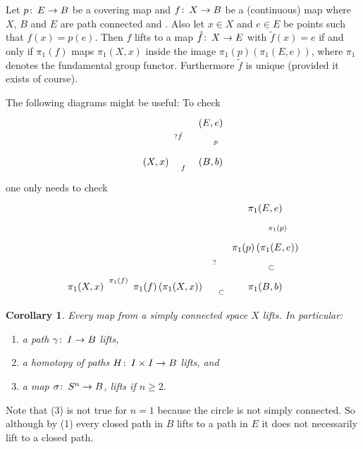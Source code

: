 \documentclass[12pt]{article}
\newtheorem{cor}[thm]{Corollary}
\theoremstyle{definition}
\theoremstyle{remark}
\numberwithin{equation}{subsection}
\newcommand{\Gg}{\gamma}
\newcommand{\Gs}{\sigma}
\def\co{\colon\thinspace}
\begin{document}
Let $p\co E\to B$ be a covering map and $f\co X\to B$ be a (continuous)
map where $X$,  $B$ and $E$ are path connected and .  
Also let $x\in X$  and $e\in E$ be points such that $f(x)=p(e)$.
 Then $f$ lifts to a map $\tilde f\co X\to E$ with $\tilde f(x)=e$ if and only if
$\pi_1(f)$ maps  $\pi_1(X,x)$ inside the image
$\pi_1(p)\left(\pi_1(E,e)\right)$, where $\pi_1$ denotes the fundamental
group functor. Furthermore $\tilde f$ is unique (provided it exists of course).

The following diagrams might be useful: To check
$$\xymatrix{
&{(E,e)}\ar[d]^{p}\\
{(X,x)}\ar[r]_{f}\ar@{-->}[ur]^{?\tilde f}&{(B,b)} }
$$
one only needs to check
$$\xymatrix{
&&{\pi_1(E,e)}\ar[d]^{\pi_1(p)}\\
&&{\pi_1(p)\left(\pi_1(E,e)\right)}\ar[d]^{\subset}\\
{\pi_1(X,x)}\ar[r]^-{\pi_1(f)}&{\pi_1(f)\left(\pi_1(X,x)\right)}\ar@{-->}[ur]^{?}\ar[r]_{\quad\subset}& {\pi_1(B,b)} }
$$

\begin{cor}
  Every map from a simply connected space $X$ lifts. In particular:
  \begin{enumerate}
  \item a path $\Gg\co I\to B$ lifts, 
  \item a homotopy of paths $H\co I\times I\to B$ lifts, and
  \item a map $\Gs\co S^n\to B$, lifts if $n\geq 2$. 
  \end{enumerate}
\end{cor}

Note that (3) is not true for $n=1$ because the circle is not simply
connected.  So although by (1) every closed path in $B$ lifts to a path in
$E$  it does not
necessarily lift to a closed path.
\end{document}
